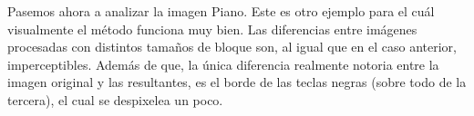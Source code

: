 \documentclass[a4paper]{article}
\begin{document}
Pasemos ahora a analizar la imagen Piano. Este es otro ejemplo para el cuál visualmente el método funciona muy bien. Las diferencias entre imágenes procesadas con distintos tamaños de bloque son, al igual que en el caso anterior, imperceptibles. Además de que, la única diferencia realmente notoria entre la imagen original y las resultantes, es el borde de las teclas negras (sobre todo de la tercera), el cual se despixelea un poco.

\begin{figure}[H]
\centering
{}
\end{figure}
\end{document}
